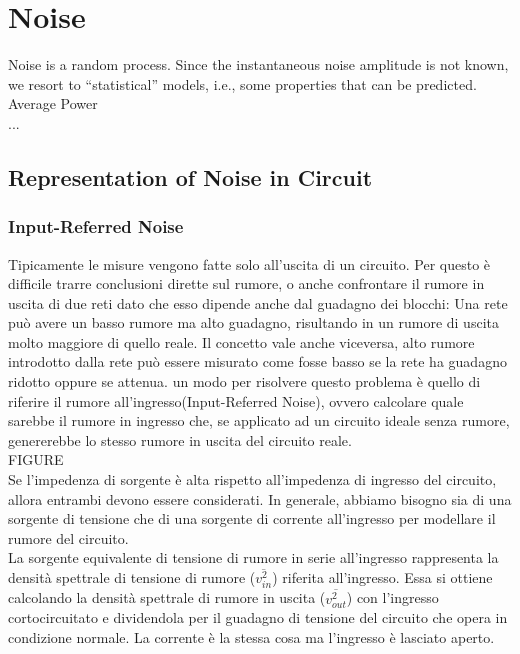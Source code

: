 \section{Noise}
Noise is a random process. Since the instantaneous noise amplitude is
not known, we resort to “statistical” models, i.e., some properties that
can be predicted.\\
Average Power\\
...
\subsection{Representation of Noise in Circuit}
\subsubsection{Input-Referred Noise}
Tipicamente le misure vengono fatte solo all'uscita di un circuito. Per questo è difficile trarre conclusioni dirette sul rumore, o anche confrontare il rumore in uscita di due reti dato che esso dipende anche dal guadagno dei blocchi: 
Una rete può avere un basso rumore ma alto guadagno, risultando in un rumore di uscita molto maggiore di quello reale. Il concetto vale anche viceversa, alto rumore introdotto dalla rete può essere misurato come fosse basso se la rete ha guadagno ridotto oppure se attenua.
un modo per risolvere questo problema è quello di riferire il rumore all'ingresso(Input-Referred Noise), ovvero calcolare quale sarebbe il rumore in ingresso che, se applicato ad un circuito ideale senza rumore, genererebbe lo stesso rumore in uscita del circuito reale.\\

FIGURE\\

Se l'impedenza di sorgente è alta rispetto all'impedenza di ingresso del circuito, allora entrambi devono essere considerati. In generale, abbiamo bisogno sia di una sorgente di tensione che di una sorgente di corrente all'ingresso per modellare il rumore del circuito.\\

La sorgente equivalente di tensione di rumore in serie all'ingresso rappresenta la densità spettrale di tensione di rumore ($\overline{v_{in}^2}$) riferita all'ingresso. Essa si ottiene calcolando la densità spettrale di rumore in uscita ($\overline{v_{out}^2}$) con l'ingresso cortocircuitato e dividendola per il guadagno di tensione del circuito che opera in condizione normale.
La corrente è la stessa cosa ma l'ingresso è lasciato aperto.\\

